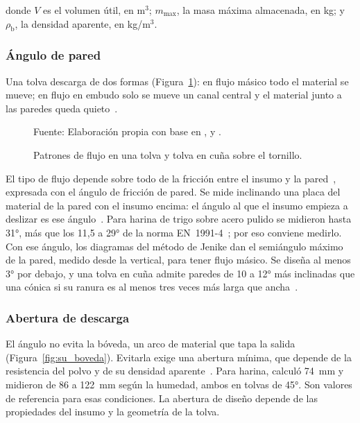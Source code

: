 \noindent donde $V$ es el volumen útil, en m$^{3}$; $m_{\max}$, la masa máxima
almacenada, en kg; y $\rho_{\mathrm{b}}$, la densidad aparente, en kg/m$^{3}$.

\subsubsection{Ángulo de pared}
\label{subsubsec:fund_tolva}

Una tolva descarga de dos formas (Figura~\ref{fig:patrones_tolva}): en flujo
másico todo el material se mueve; en flujo en embudo solo se mueve un canal
central y el material junto a las paredes queda
quieto~\parencite{su2017arching,mehos2016hopper}.

\begin{figure}[H]
    \centering
    \resizebox{0.95\textwidth}{!}{}
    \caption{Patrones de flujo en una tolva y tolva en cuña sobre el tornillo.}
    \label{fig:patrones_tolva}
    \vspace{0.2em}
    {\footnotesize Fuente: Elaboración propia con base en
    \textcite{su2017arching}, \textcite{mehos2016hopper} y
    \textcite{bates2000screw}.}
\end{figure}

El tipo de flujo depende sobre todo de la fricción entre el insumo y la
pared~\parencite{sogaard2017jenike}, expresada con el ángulo de fricción de pared.
Se mide inclinando una placa del material de la pared con el insumo encima: el
ángulo al que el insumo empieza a deslizar es ese
ángulo~\parencite{guan2009flour}. Para harina de trigo sobre acero pulido se
midieron hasta 31°, más que los 11,5 a 29° de la norma
EN~1991-4~\parencite{lopesneto2017flow}; por eso conviene medirlo. Con ese ángulo,
los diagramas del método de Jenike dan el semiángulo máximo de la pared, medido
desde la vertical, para tener flujo másico. Se diseña al menos 3° por debajo, y
una tolva en cuña admite paredes de 10 a 12° más inclinadas que una cónica si su
ranura es al menos tres veces más larga que ancha~\parencite{mehos2016hopper}.

\subsubsection{Abertura de descarga}
\label{subsubsec:fund_abertura}

El ángulo no evita la bóveda, un arco de material que tapa la salida
(Figura~\ref{fig:su_boveda}). Evitarla exige una abertura mínima, que depende de
la resistencia del polvo y de su densidad aparente~\parencite{su2017arching}. Para
harina, \textcite{su2017arching} calculó 74~mm y \textcite{guan2009flour} midieron
de 86 a 122~mm según la humedad, ambos en tolvas de 45°. Son valores de
referencia para esas condiciones. La abertura de diseño depende de las
propiedades del insumo y la geometría de la tolva.

